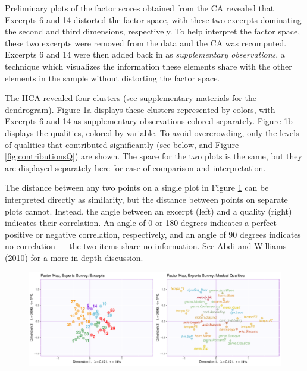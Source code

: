 \documentclass[
  english,
  man,floatsintext]{apa6}
\begin{document}
Preliminary plots of the factor scores obtained from the CA revealed that Excerpts 6 and 14 distorted the factor space, with these two excerpts dominating the second and third dimensions, respectively. To help interpret the factor space, these two excerpts were removed from the data and the CA was recomputed. Excerpts 6 and 14 were then added back in as \emph{supplementary observations}, a technique which visualizes the information these elements share with the other elements in the sample without distorting the factor space.

The HCA revealed four clusters (see supplementary materials for the dendrogram). Figure \ref{fig:factormapsQ}a displays these clusters represented by colors, with Excerpts 6 and 14 as supplementary observations colored separately. Figure \ref{fig:factormapsQ}b displays the qualities, colored by variable. To avoid overcrowding, only the levels of qualities that contributed significantly (see below, and Figure \ref{fig:contributionsQ}) are shown. The space for the two plots is the same, but they are displayed separately here for ease of comparison and interpretation.

The distance between any two points on a single plot in Figure \ref{fig:factormapsQ} can be interpreted directly as similarity, but the distance between points on separate plots cannot. Instead, the angle between an excerpt (left) and a quality (right) indicates their correlation. An angle of 0 or 180 degrees indicates a perfect positive or negative correlation, respectively, and an angle of 90 degrees indicates no correlation --- the two items share no information. See Abdi and Williams (2010) for a more in-depth discussion.

\begin{figure}

{\centering \includegraphics{Music-Descriptor-Space_files/figure-latex/factormapsQ-1} 

}

\caption{ }\label{fig:factormapsQ}
\end{figure}
\end{document}
